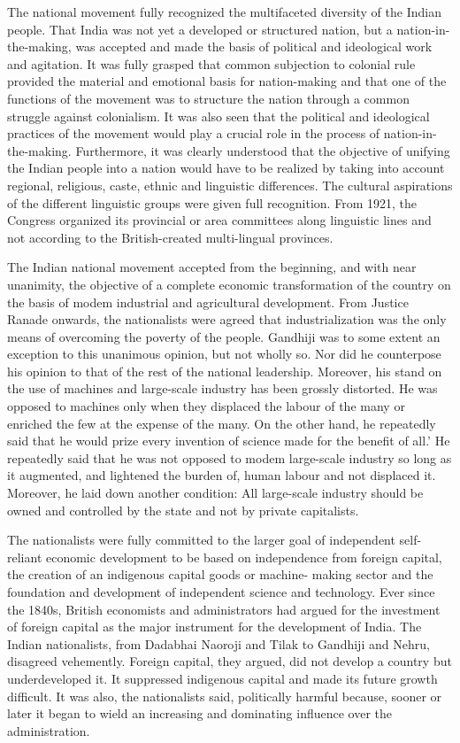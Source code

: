 The national movement fully recognized the multifaceted diversity of the Indian people. That India was not yet a developed or structured nation, but a nation-in-the-making, was accepted and made the basis of political and ideological work and agitation. It was fully grasped that common subjection to colonial rule provided the material and emotional basis for nation-making and that one of the functions of the movement was to structure the nation through a common struggle against colonialism. It was also seen that the political and ideological practices of the movement would play a crucial role in the process of nation-in-the-making. Furthermore, it was clearly understood that the objective of unifying the Indian people into a nation would have to be realized by taking into account regional, religious, caste, ethnic and linguistic differences. The cultural aspirations of the different linguistic groups were given full recognition. From 1921, the Congress organized its provincial or area committees along linguistic lines and not according to the British-created multi-lingual provinces.

The Indian national movement accepted from the beginning, and with near unanimity, the objective of a complete economic transformation of the country on the basis of modem industrial and agricultural development. From Justice Ranade onwards, the nationalists were agreed that industrialization was the only means of overcoming the poverty of the people. Gandhiji was to some extent an exception to this unanimous opinion, but not wholly so. Nor did he counterpose his opinion to that of the rest of the national leadership. Moreover, his stand on the use of machines and large-scale industry has been grossly distorted. He was opposed to machines only when they displaced the labour of the many or enriched the few at the expense of the many. On the other hand, he repeatedly said that he would prize every invention of science made for the benefit of all.' He repeatedly said that he was not opposed to modem large-scale industry so long as it augmented, and lightened the burden of, human labour and not displaced it. Moreover, he laid down another condition: All large-scale industry should be owned and controlled by the state and not by private capitalists.

The nationalists were fully committed to the larger goal of independent self-reliant economic development to be based on independence from foreign capital, the creation of an indigenous capital goods or machine- making sector and the foundation and development of independent science and technology. Ever since the 1840s, British economists and administrators had argued for the investment of foreign capital as the major instrument for the development of India. The Indian nationalists, from Dadabhai Naoroji and Tilak to Gandhiji and Nehru, disagreed vehemently. Foreign capital, they argued, did not develop a country but underdeveloped it. It suppressed indigenous capital and made its future growth difficult. It was also, the nationalists said, politically harmful because, sooner or later it began to wield an increasing and dominating influence over the administration.


